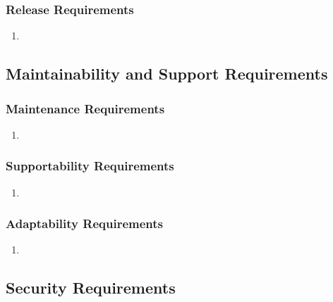 \documentclass[]{article}
\begin{document}
\subsubsection{Release Requirements}
\label{ssub:release_requirements}
\begin{enumerate}[label={OE-R\arabic*.}]
    \item 
\end{enumerate}


\subsection{Maintainability and Support Requirements}
\label{sub:maintainability_and_support_requirements}

\subsubsection{Maintenance Requirements}
\label{ssub:maintenance_requirements}
\begin{enumerate}[label={MS-M\arabic*.}]
    \item 
\end{enumerate}

\subsubsection{Supportability Requirements}
\label{ssub:supportability_requirements}
\begin{enumerate}[label={MS-S\arabic*.}]
    \item 
\end{enumerate}

\subsubsection{Adaptability Requirements}
\label{ssub:adaptability_requirements}
\begin{enumerate}[label={MS-A\arabic*.}]
    \item 
\end{enumerate}


\subsection{Security Requirements}
\label{sub:security_requirements}
\end{document}
